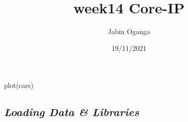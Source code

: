 \documentclass[
]{article}
\title{week14 Core-IP}
\author{Jabin Oganga}
\date{19/11/2021}
\newenvironment{Shaded}{\begin{snugshade}}{\end{snugshade}}
\newcommand{\AttributeTok}[1]{\textcolor[rgb]{0.77,0.63,0.00}{#1}}
\newcommand{\ConstantTok}[1]{\textcolor[rgb]{0.00,0.00,0.00}{#1}}
\newcommand{\FunctionTok}[1]{\textcolor[rgb]{0.00,0.00,0.00}{#1}}
\newcommand{\NormalTok}[1]{#1}
\newcommand{\SpecialCharTok}[1]{\textcolor[rgb]{0.00,0.00,0.00}{#1}}
\begin{document}
\maketitle

\begin{Shaded}
\end{Shaded}

\begin{Shaded}
\begin{Highlighting}[]
\FunctionTok{plot}\NormalTok{(cars)}
\end{Highlighting}
\end{Shaded}

\hypertarget{loading-data-libraries}{%
\subsection{\texorpdfstring{\textbf{\emph{Loading Data \&
Libraries}}}{Loading Data \& Libraries}}\label{loading-data-libraries}}
\end{document}
